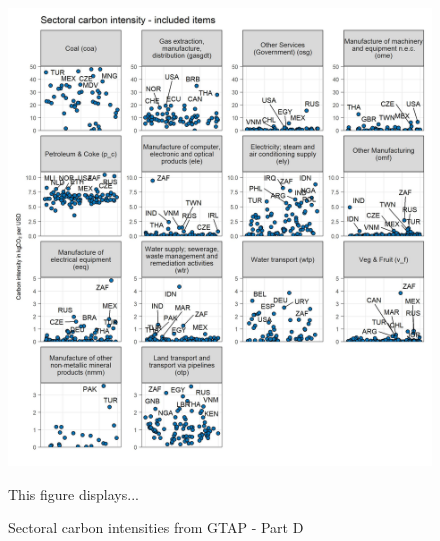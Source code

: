 \documentclass[12pt, a4paper]{article}
\newenvironment{subcaption}
{\strut
\vspace{-5pt}
\begin{minipage}[b]{0.9\textwidth}
  \hspace*{-\parindent}
  \footnotesize}
 {\end{minipage}}
\begin{document}
\begin{figure}[ht!]
  \centering
  \caption{Sectoral carbon intensities from GTAP - Part D} \label{fig:B4}
  \includegraphics{Analysis_Carbon_Intensities_GTAP/Figure_2.1.1_D_2017}
  \begin{subcaption}
    This figure displays...
  \end{subcaption}

\end{figure}

\clearpage

\end{document}
